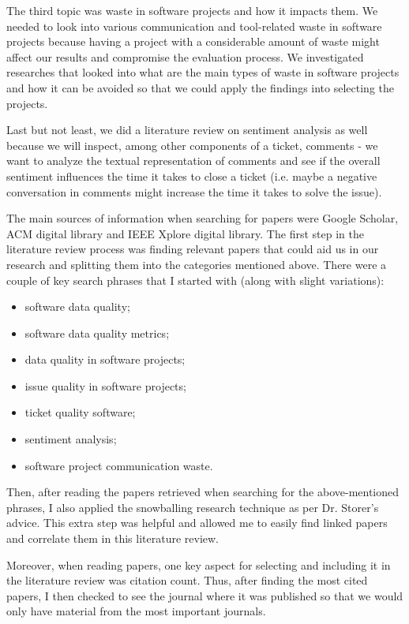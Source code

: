 \documentclass{mprop}
\begin{document}
The third topic was waste in software projects and how it impacts them. We needed to
look into various communication and tool-related waste in software projects because
having a project with a considerable amount of waste might affect our results and
compromise the evaluation process. We investigated researches that looked into what
are the main types of waste in software projects and how it can be avoided so that
we could apply the findings into selecting the projects.

Last but not least, we did a literature review on sentiment analysis as well 
because we will inspect, among other components of a ticket, comments - we want 
to analyze the textual representation of comments and see if the overall 
sentiment influences the time it takes to close a ticket (i.e. maybe a negative 
conversation in comments might increase the time it takes to solve the issue).

The main sources of information when searching for papers were Google Scholar, 
ACM digital library and IEEE Xplore digital library. The first step in the 
literature review process was finding relevant papers that could aid us in
our research and splitting them into the categories mentioned above. There were
a couple of key search phrases that I started with (along with slight variations):
  \begin{itemize}
    \item software data quality;
    \item software data quality metrics;
    \item data quality in software projects;
    \item issue quality in software projects;
    \item ticket quality software;
    \item sentiment analysis;
    \item software project communication waste.
  \end{itemize}

Then, after reading the papers retrieved when searching for the above-mentioned
phrases, I also applied the snowballing research technique as per Dr. Storer's 
advice. This extra step was helpful and allowed me to easily find linked 
papers and correlate them in this literature review.

Moreover, when reading papers, one key aspect for selecting and including it
in the literature review was citation count. Thus, after finding the most 
cited papers, I then checked to see the journal where it was published so that
we would only have material from the most important journals.
\end{document}
